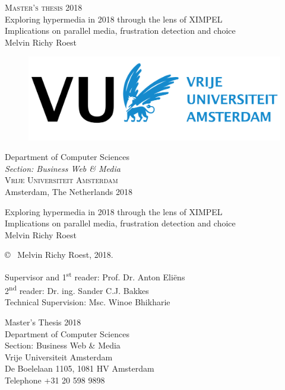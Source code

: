 \newpage
\thispagestyle{empty}
\begin{center}
	\textsc{\large Master's thesis 2018}\\[4cm]		%
	\textbf{\Large } Exploring hypermedia in 2018 through the lens of XIMPEL\\[1cm]
	{\large Implications on parallel media, frustration detection and choice}\\[1cm]
	{\large Melvin Richy Roest}
	
	\vfill	
	\begin{figure}[H]
	\centering
	\includegraphics[width=0.6\linewidth]{images/vu_logo.png} \\	
	\end{figure}	\vspace{5mm}	
	
	Department of Computer Sciences\\
	\emph{Section: Business Web \& Media}\\
	\textsc{Vrije Universiteit Amsterdam} \\
	Amsterdam, The Netherlands 2018 \\
\end{center}


\newpage
\thispagestyle{plain}
\vspace*{4.5cm}
Exploring hypermedia in 2018 through the lens of XIMPEL\\
Implications on parallel media, frustration detection and choice\\
Melvin Richy Roest \setlength{\parskip}{1cm}

\copyright ~ Melvin Richy Roest, 2018. \setlength{\parskip}{1cm}

Supervisor and 1\textsuperscript{st} reader: Prof. Dr. Anton Eli\"ens\\
2\textsuperscript{nd} reader: Dr. ing. Sander C.J. Bakkes\\
Technical Supervision: Msc. Winoe Bhikharie\\
\setlength{\parskip}{1cm}

Master's Thesis 2018\\	%
Department of Computer Sciences\\
Section: Business Web \& Media\\
Vrije Universiteit Amsterdam\\
De Boelelaan 1105, 1081 HV Amsterdam\\
Telephone +31 20 598 9898 \setlength{\parskip}{0.5cm}

